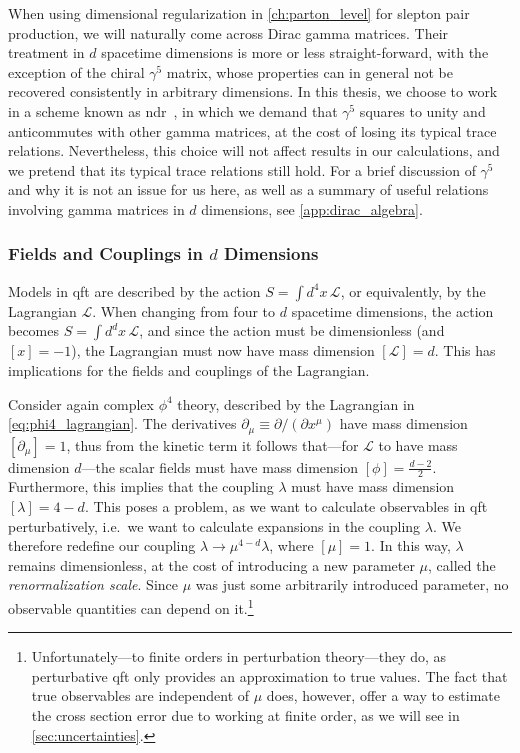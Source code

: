 When using dimensional regularization in \cref{ch:parton_level} for slepton pair production, we will naturally come across Dirac gamma matrices. Their treatment in $d$ spacetime dimensions is more or less straight-forward, with the exception of the chiral $\gamma^5$ matrix, whose properties can in general not be recovered consistently in arbitrary dimensions. In this thesis, we choose to work in a scheme known as \acrfull{ndr}~\cite{Chanowitz:1979zu}, in which we demand that $\gamma^5$ squares to unity and anticommutes with other gamma matrices, at the cost of losing its typical trace relations.
Nevertheless, this choice will not affect results in our calculations, and we pretend that its typical trace relations still hold.
For a brief discussion of $\gamma^5$ and why it is not an issue for us here, as well as a summary of useful relations involving gamma matrices in $d$ dimensions, see \cref{app:dirac_algebra}.

\subsubsection{Fields and Couplings in $d$ Dimensions}
Models in \gls{qft} are described by the action $S=\int d^4x\,\mathcal{L}$, or equivalently, by the Lagrangian $\mathcal{L}$.
When changing from four to $d$ spacetime dimensions, the action becomes $S=\int d^dx\,\mathcal{L}$, and since the action must be dimensionless (and $[x]=-1$), the Lagrangian must now have mass dimension $[\mathcal{L}]=d$. This has implications for the fields and couplings of the Lagrangian.

Consider again complex $\phi^4$ theory, described by the Lagrangian in \cref{eq:phi4_lagrangian}. The derivatives $\partial_\mu \equiv \partial/(\partial x^\mu)$ have mass dimension $[\partial_\mu]=1$, thus from the kinetic term it follows that---for $\mathcal{L}$ to have mass dimension $d$---the scalar fields must have mass dimension $[\phi]=\frac{d-2}{2}$. Furthermore, this implies that the coupling $\lambda$ must have mass dimension $[\lambda]=4-d$.
This poses a problem, as we want to calculate observables in \gls{qft} perturbatively, i.e.\ we want to calculate expansions in the coupling $\lambda$.
We therefore redefine our coupling $\lambda \to \mu^{4-d}\lambda$, where $[\mu]=1$.
In this way, $\lambda$ remains dimensionless, at the cost of introducing a new parameter $\mu$, called the \emph{renormalization scale}. Since $\mu$ was just some arbitrarily introduced parameter, no observable quantities can depend on it.\footnote{Unfortunately---to finite orders in perturbation theory---they do, as perturbative \gls{qft} only provides an approximation to true values. The fact that true observables are independent of $\mu$ does, however, offer a way to estimate the cross section error due to working at finite order, as we will see in \cref{sec:uncertainties}.}

